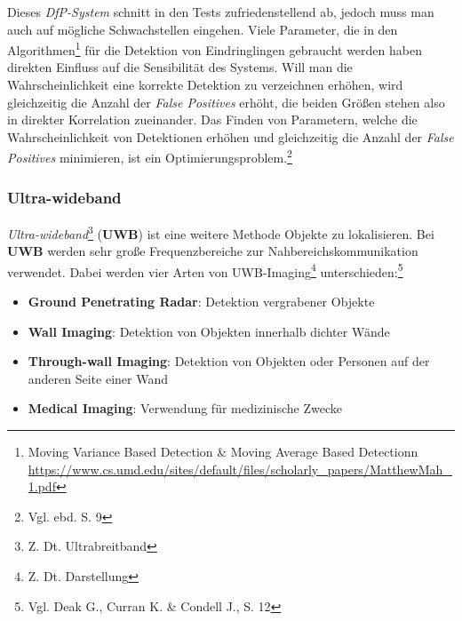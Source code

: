 Dieses \textit{DfP-System} schnitt in den Tests zufriedenstellend ab, jedoch muss man auch auf mögliche Schwachstellen eingehen. Viele Parameter, die in den Algorithmen\footnote{Moving Variance Based Detection \& Moving Average Based Detectionn \url{https://www.cs.umd.edu/sites/default/files/scholarly_papers/MatthewMah_1.pdf}} für die Detektion von Eindringlingen gebraucht werden haben direkten Einfluss auf die Sensibilität des Systems. Will man die Wahrscheinlichkeit eine korrekte Detektion zu verzeichnen erhöhen, wird gleichzeitig die Anzahl der \textit{False Positives} erhöht, die beiden Größen stehen also in direkter Korrelation zueinander. Das Finden von Parametern, welche die Wahrscheinlichkeit von Detektionen erhöhen und gleichzeitig die Anzahl der \textit{False Positives} minimieren, ist ein Optimierungsproblem.\footnote{Vgl. ebd. S. 9}

\subsubsection{Ultra-wideband}

\textit{Ultra-wideband}\footnote{Z. Dt. Ultrabreitband} (\textbf{UWB}) ist eine weitere Methode Objekte zu lokalisieren. Bei \textbf{UWB} werden sehr große Frequenzbereiche zur Nahbereichskommunikation verwendet. Dabei werden vier Arten von UWB-Imaging\footnote{Z. Dt. Darstellung} unterschieden:\footnote{Vgl. Deak G.,  Curran K. \& Condell J., S. 12}
\begin{itemize}
 	\item \textbf{Ground Penetrating Radar}: Detektion vergrabener Objekte 
 	\item \textbf{Wall Imaging}: Detektion von Objekten innerhalb dichter Wände
 	\item \textbf{Through-wall Imaging}: Detektion von Objekten oder Personen auf der anderen Seite einer Wand
 	\item \textbf{Medical Imaging}: Verwendung für medizinische Zwecke
 \end{itemize} 

